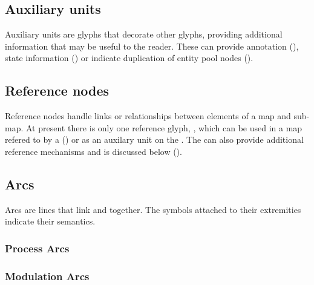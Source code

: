 

\subsection{Auxiliary units}

Auxiliary units are glyphs that decorate other glyphs, providing additional information that may be useful to the reader. These can provide annotation (), state information () or indicate duplication of entity pool nodes ().





\subsection{Reference nodes}

Reference nodes handle links or relationships between elements of a
map and sub-map. At present there is only one reference glyph,
, which can be used in a map refered to by a 
() or as an auxilary unit on the . The
 can also provide additional reference mechanisms
and is discussed below ().



\subsection{Arcs}\label{sec:arcs}

Arcs are lines that link  and  together.  The symbols attached to their extremities indicate their semantics.

\subsubsection{Process Arcs}




\subsubsection{Modulation Arcs}







